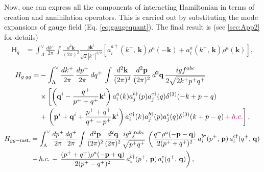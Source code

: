 \documentclass[a4paper,11pt]{article}
\begin{document}
Now, one can express all the components of interacting Hamiltonian in terms of creation and annihilation operators. This is carried out by substituting the mode expansions of gauge field (Eq. \eqref{eq:gaugequant}). The final result is (see \ref{sec:App2} for details)
 \begin{align}\label{eikohg}
\mathsf{H}_{g} & =\int_{\Lambda}^{\vee}\frac{dk^{+}}{2\pi}\int\frac{d^{2}\mathbf{k}}{(2\pi)^{2}}\frac{g\mathbf{k}^{i}}{\sqrt{2}|k^{+}|^{3/2}}\left[a_{i}^{a\dagger}(k^{+},\, \mathbf{k})\rho^{a}(-\mathbf{k})+a_{i}^{a}(k^{+},\, \mathbf{k})\rho^{a}(\mathbf{k})\right],
 \end{align}
 \begin{align} \label{eq:H_g-gg}
H_{g\: gg}= & -\int_{\Lambda}^{\vee}\frac{dk^{+}}{2\pi}\,\frac{dp^{+}}{2\pi}\, dq^{+}\,\int\frac{d^{2}\mathbf{k}}{(2\pi)^{2}}\,\frac{d^{2}\mathbf{p}}{(2\pi)^{2}}\, d^{2}\mathbf{q}\,\frac{igf^{abc}}{2\sqrt{2k^{+}p^{+}q^{+}}}\notag \\ 
&\times\left[\left(\mathbf{q}^{i}-\frac{q^{+}}{p^{+}+q^{+}}\mathbf{k}^{i}\right)a_{i}^{a}(k)a_{j}^{b\dagger}(p)a_{j}^{c\dagger}(q)\delta^{(3)}(-k+p+q)\right.\notag \\ 
&+\left.\left(\mathbf{p}^{i}+\mathbf{q}^{i}+\frac{p^{+}+q^{+}}{q^{+}-p^{+}}\mathbf{k}^{i}\right)a_{i}^{a\dagger}(k)a_{j}^{b\dagger}(p)a_{j}^{c}(q)\delta^{(3)}(k+p-q)\,{\color{chg}+\,h.c.}\right],
 \end{align}
    \begin{align} \label{eq:H_gg-inst.}
H_{gg-\text{inst.}} & =\int_{\Lambda}^{\vee}\frac{dp^{+}}{2\pi}\frac{dq^{+}}{2\pi}\int\frac{d^{2}\mathbf{p}}{(2\pi)^{2}}\frac{d^{2}\mathbf{q}}{(2\pi)^{2}}\frac{ig^{2}f^{abc}}{\sqrt{p^{+}q^{+}}}\,\left(\frac{q^{+}\rho^{a}(-\mathbf{p}-\mathbf{q})}{2(p^{+}+q^{+})^{2}}\, a_{i}^{b\dagger}(p^{+},\,\mathbf{p})\, a_{i}^{c\dagger}(q^{+},\,\mathbf{q})\right.\notag \\ 
&\left.-\, h.c.\,-\,\frac{(p^{+}+q^{+})\rho^{a}(-\mathbf{p}+\mathbf{q})}{2(p^{+}-q^{+})^{2}}\, a_{i}^{b\dagger}(p^{+},\,\mathbf{p})\, a_{i}^{c}(q^{+},\,\mathbf{q})\right),
\end{align}
\end{document}

